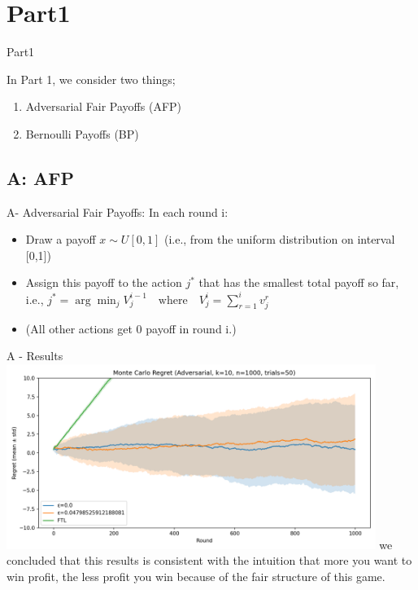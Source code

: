 \documentclass{beamer}
\begin{document}
\section{Part1}
\begin{frame}{Part1}

In Part 1, we consider two things;
\begin{enumerate}
    \item Adversarial Fair Payoffs (AFP) 
    \item Bernoulli Payoffs (BP)
\end{enumerate}
\end{frame}

\subsection{A: AFP}
\begin{frame}{A- Adversarial Fair Payoffs:}
       In each round i:
    \begin{itemize}
        \item Draw a payoff $x \sim U[0,1]$ (i.e., from the uniform distribution on interval [0,1])
        \item Assign this payoff to the action $j^*$ that has the smallest total payoff so far,\\
        i.e., $j^* = \arg\min_j V^{i-1}_{j} \quad \text{where} \quad V^{i}_{j} = \sum_{r=1}^{i} v^{r}_{j}$
        \item (All other actions get 0 payoff in round i.)
    \end{itemize} 
\end{frame}

\begin{frame}{A - Results}
    \includegraphics[width=0.9\textwidth]{figures/adv_mc_regret.png}
    we concluded that this results is consistent with the intuition that more you want to win profit, the less profit you win because of the fair structure of this game.
\end{frame}
\end{document}
